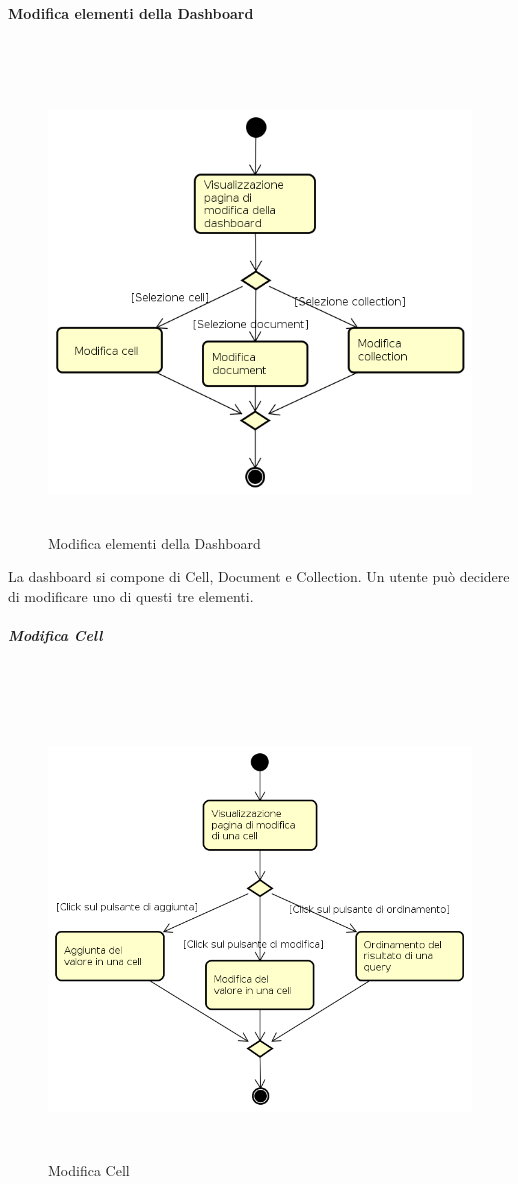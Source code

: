 \paragraph{Modifica elementi della Dashboard} \mbox{} \\
\begin{figure}[H]
\begin{center}
\includegraphics[height=12cm]{res/sections/backend/activities/modificaElementDashboard.png}
\caption{Modifica elementi della Dashboard}
\end{center}
\end{figure}
La dashboard si compone di Cell, Document e Collection. Un utente può decidere di modificare uno di questi tre elementi.
\subparagraph{Modifica Cell} \mbox{} \\
\begin{figure}[H]
\begin{center}
\includegraphics[height=12cm]{res/sections/backend/activities/modificaCell.png}
\caption{Modifica Cell}
\end{center}
\end{figure}
